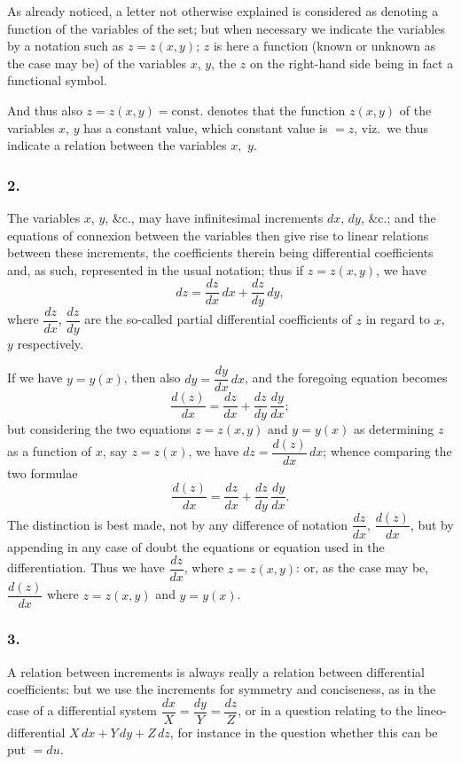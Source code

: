 \documentclass[12pt,a4paper]{article}
\theoremstyle{plain}
\begin{document}
As already noticed, a letter not otherwise explained is considered as denoting a function of the variables of the set; but when necessary we indicate the variables by a notation such as $z = z(x, y)$; $z$ is here a function (known or unknown as the case may be) of the variables $x$, $y$, the $z$ on the right-hand side being in fact a functional symbol.

And thus also $z = z(x, y) = \text{const.}$ denotes that the function $z(x, y)$ of the variables $x$, $y$ has a constant value, which constant value is $=z$, viz.~we thus indicate a relation between the variables $x$,~$y$.

\newpage
\setcounter{page}{115}

\subsubsection*{2.}

The variables $x$, $y$, \&c., may have infinitesimal increments $dx$, $dy$, \&c.; and the equations of connexion between the variables then give rise to linear relations between these increments, the coefficients therein being differential coefficients and, as such, represented in the usual notation; thus if $z = z(x, y)$, we have
\[
dz = \frac{dz}{dx}\,dx + \frac{dz}{dy}\,dy,
\]
where $\dfrac{dz}{dx}$, $\dfrac{dz}{dy}$ are the so-called partial differential coefficients of $z$ in regard to $x$, $y$ respectively.

If we have $y = y(x)$, then also $dy = \dfrac{dy}{dx}\,dx$, and the foregoing equation becomes
\[
\frac{d(z)}{dx} = \frac{dz}{dx} + \frac{dz}{dy}\,\frac{dy}{dx};
\]
but considering the two equations $z = z(x, y)$ and $y = y(x)$ as determining $z$ as a function of $x$, say $z = z(x)$, we have $dz = \dfrac{d(z)}{dx}\,dx$; whence comparing the two formulae
\[
\frac{d(z)}{dx} = \frac{dz}{dx} + \frac{dz}{dy}\,\frac{dy}{dx}.
\]
The distinction is best made, not by any difference of notation $\dfrac{dz}{dx}$, $\dfrac{d(z)}{dx}$, but by appending in any case of doubt the equations or equation used in the differentiation. Thus we have $\dfrac{dz}{dx}$, where $z = z(x, y)$: or, as the case may be, $\dfrac{d(z)}{dx}$ where $z = z(x, y)$ and $y = y(x)$.

\subsubsection*{3.}

A relation between increments is always really a relation between differential coefficients: but we use the increments for symmetry and conciseness, as in the case of a differential system $\dfrac{dx}{X} = \dfrac{dy}{Y} = \dfrac{dz}{Z}$, or in a question relating to the lineo-differential $X\,dx + Y\,dy + Z\,dz$, for instance in the question whether this can be put $= du$.
\end{document}
